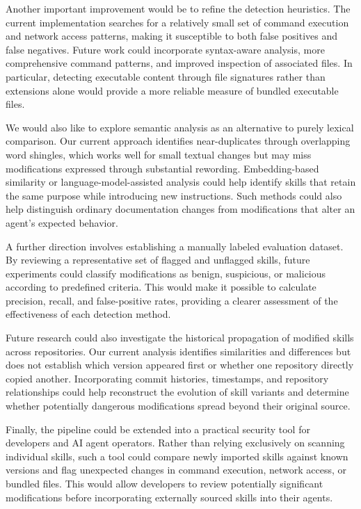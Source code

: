 \documentclass[sigconf,review]{acmart}
\begin{document}
Another important improvement would be to refine the detection heuristics. The current implementation searches for a relatively small set of command execution and network access patterns, making it susceptible to both false positives and false negatives. Future work could incorporate syntax-aware analysis, more comprehensive command patterns, and improved inspection of associated files. In particular, detecting executable content through file signatures rather than extensions alone would provide a more reliable measure of bundled executable files.

We would also like to explore semantic analysis as an alternative to purely lexical comparison. Our current approach identifies near-duplicates through overlapping word shingles, which works well for small textual changes but may miss modifications expressed through substantial rewording. Embedding-based similarity or language-model-assisted analysis could help identify skills that retain the same purpose while introducing new instructions. Such methods could also help distinguish ordinary documentation changes from modifications that alter an agent's expected behavior.

A further direction involves establishing a manually labeled evaluation dataset. By reviewing a representative set of flagged and unflagged skills, future experiments could classify modifications as benign, suspicious, or malicious according to predefined criteria. This would make it possible to calculate precision, recall, and false-positive rates, providing a clearer assessment of the effectiveness of each detection method.

Future research could also investigate the historical propagation of modified skills across repositories. Our current analysis identifies similarities and differences but does not establish which version appeared first or whether one repository directly copied another. Incorporating commit histories, timestamps, and repository relationships could help reconstruct the evolution of skill variants and determine whether potentially dangerous modifications spread beyond their original source.

Finally, the pipeline could be extended into a practical security tool for developers and AI agent operators. Rather than relying exclusively on scanning individual skills, such a tool could compare newly imported skills against known versions and flag unexpected changes in command execution, network access, or bundled files. This would allow developers to review potentially significant modifications before incorporating externally sourced skills into their agents.
\end{document}

